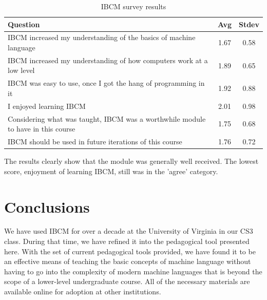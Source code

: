 \begin{table}[h]
\centering
\begin{tabular}{|p{5in}|c|c|}  \hline
\bf Question & \bf Avg & \bf Stdev \\ \hline \hline
IBCM increased my understanding of the basics of machine language &
1.67 & 0.58 \\ \hline
IBCM increased my understanding of how computers work at a low level &
1.89 & 0.65 \\ \hline
IBCM was easy to use, once I got the hang of programming in it & 1.92
& 0.88 \\ \hline
I enjoyed learning IBCM & 2.01 & 0.98 \\ \hline
Considering what was taught, IBCM was a worthwhile module to have in
this course & 1.75 & 0.68 \\ \hline
IBCM should be used in future iterations of this course & 1.76 & 0.72
\\ \hline
\end{tabular}
\caption{IBCM survey results}
\label{IBCM-survey-results.tbl}
\end{table}

The results clearly show that the module was generally well received.
The lowest score, enjoyment of learning IBCM, still was in the 'agree'
category.

\section{Conclusions}

We have used IBCM for over a decade at the University of
Virginia in our CS3
class.  During that time, we have refined it into the pedagogical tool
presented here.  With the set of current pedagogical tools provided,
we have found it to be an effective means of teaching the basic
concepts of machine language without having to go into the complexity
of modern machine languages that is beyond the scope of a lower-level
undergraduate course.  All of the necessary materials are available
online for adoption at other institutions.
